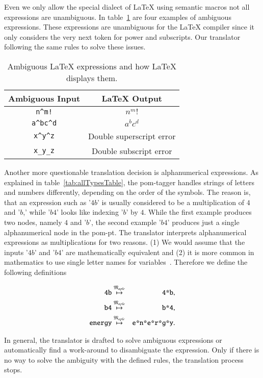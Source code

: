 Even we only allow the special dialect of \LaTeX{} using semantic macros not all expressions are unambiguous. In table~\ref{tab:amb-latex} are four examples of ambiguous expressions. These expressions are unambiguous for the \LaTeX{} compiler since it only considers the very next token for power and subscripts. Our translator following the same rules to solve these issues.

\begin{table}[ht]
\centering
\begin{tabular}{cc}
	\hline
	Ambiguous Input & \LaTeX{} Output\\
	\hline
	\verb|n^m!| & $n^m!$\\
	\verb|a^bc^d| & $a^bc^d$\\
	\verb|x^y^z| & Double superscript error\\
	\verb|x_y_z| & Double subscript error\\
	\hline
\end{tabular}
\caption{Ambiguous \LaTeX{} expressions and how \LaTeX{} displays them.}
\label{tab:amb-latex}
\end{table}

Another more questionable translation decision is alphanumerical expressions. As explained in table~\ref{tab:allTypesTable}, the \gls*{pom}-tagger handles strings of letters and numbers differently, depending on the order of the symbols. The reason is, that an expression such as '$4b$' is usually considered to be a multiplication of $4$ and '$b$,' while '$b4$' looks like indexing '$b$' by $4$. While the first example produces two nodes, namely $4$ and '$b$', the second example '$b4$' produces just a single alphanumerical node in the \gls*{pom-pt}. The translator interprets alphanumerical expressions as multiplications for two reasons. (1) We would assume that the inputs '$4b$' and '$b4$' are mathematically equivalent and (2) it is more common in mathematics to use single letter names for variables~\parencite{Notation:History}. Therefore we define the following definitions

\begin{eqnarray*}
\verb|4b| & \overset{\langMaple}{\mapsto} & \verb|4*b|,\\
\verb|b4| & \overset{\langMaple}{\mapsto} & \verb|b*4|,\\
\verb|energy| & \overset{\langMaple}{\mapsto} & \verb|e*n*e*r*g*y|.
\end{eqnarray*}

In general, the translator is drafted to solve ambiguous expressions or automatically find a work-around to disambiguate the expression. Only if there is no way to solve the ambiguity with the defined rules, the translation process stops.

